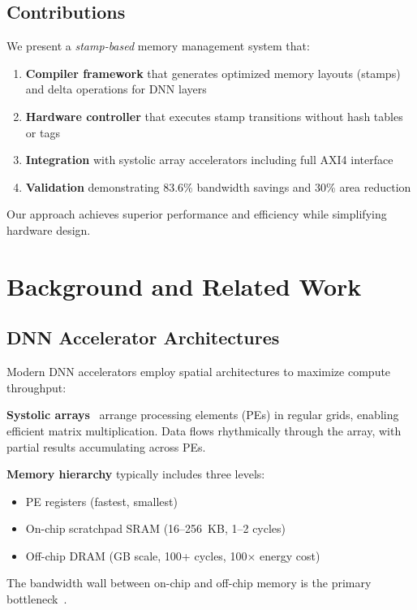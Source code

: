 \documentclass[conference]{IEEEtran}
\begin{document}
\subsection{Contributions}

We present a \textit{stamp-based} memory management system that:

\begin{enumerate}
\item \textbf{Compiler framework} that generates optimized memory layouts (stamps) and delta operations for DNN layers
\item \textbf{Hardware controller} that executes stamp transitions without hash tables or tags
\item \textbf{Integration} with systolic array accelerators including full AXI4 interface
\item \textbf{Validation} demonstrating 83.6\% bandwidth savings and 30\% area reduction
\end{enumerate}

Our approach achieves superior performance and efficiency while simplifying hardware design.

\section{Background and Related Work}

\subsection{DNN Accelerator Architectures}

Modern DNN accelerators employ spatial architectures to maximize compute throughput:

\textbf{Systolic arrays}~\cite{kung1982systolic, jouppi2017tpu} arrange processing elements (PEs) in regular grids, enabling efficient matrix multiplication. Data flows rhythmically through the array, with partial results accumulating across PEs.

\textbf{Memory hierarchy} typically includes three levels:
\begin{itemize}
\item PE registers (fastest, smallest)
\item On-chip scratchpad SRAM (16--256~KB, 1--2 cycles)
\item Off-chip DRAM (GB scale, 100+ cycles, 100$\times$ energy cost)
\end{itemize}

The bandwidth wall between on-chip and off-chip memory is the primary bottleneck~\cite{horowitz20141}.
\end{document}
